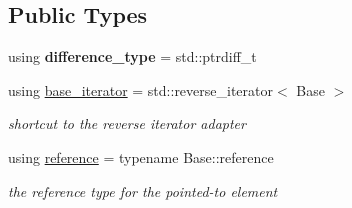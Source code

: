 \subsection*{Public Types}
\begin{DoxyCompactItemize}
\item 
\mbox{\label{classnlohmann_1_1detail_1_1json__reverse__iterator_a9ab55987c05ec6427ad36082e351cc45}} 
using {\bfseries difference\+\_\+type} = std\+::ptrdiff\+\_\+t
\item 
\mbox{\label{classnlohmann_1_1detail_1_1json__reverse__iterator_a6b2ef1d632fe49bfcc22fbd1abd62395}} 
using \hyperlink{classnlohmann_1_1detail_1_1json__reverse__iterator_a6b2ef1d632fe49bfcc22fbd1abd62395}{base\+\_\+iterator} = std\+::reverse\+\_\+iterator$<$ Base $>$
\begin{DoxyCompactList}\small\item\em shortcut to the reverse iterator adapter \end{DoxyCompactList}\item 
\mbox{\label{classnlohmann_1_1detail_1_1json__reverse__iterator_a42f51a69bac7b2aebb613b2164e457f1}} 
using \hyperlink{classnlohmann_1_1detail_1_1json__reverse__iterator_a42f51a69bac7b2aebb613b2164e457f1}{reference} = typename Base\+::reference
\begin{DoxyCompactList}\small\item\em the reference type for the pointed-\/to element \end{DoxyCompactList}\end{DoxyCompactItemize}
